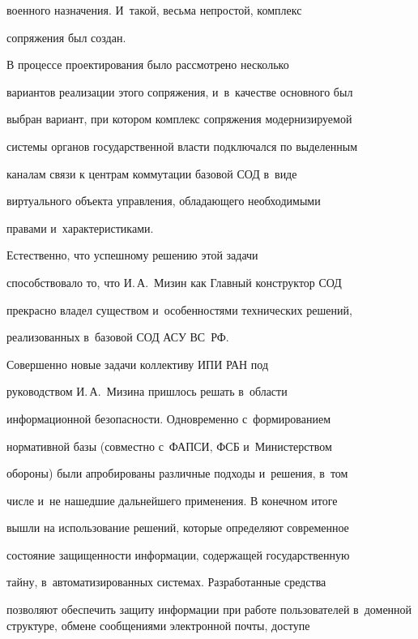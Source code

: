 военного назначения. И~такой, весьма непростой, комплекс


сопряжения был создан.





     В процессе проектирования было рассмотрено несколько


вариантов реализации этого сопряжения, и~в~качестве основного был


выбран вариант, при котором комплекс сопряжения модернизируемой


системы органов государственной власти подключался по выделенным


каналам связи к центрам коммутации базовой СОД в~виде


виртуального объекта управления, обладающего необходимыми


правами и~характеристиками.





     Естественно, что успешному решению этой задачи


способствовало то, что И.\,А.~Мизин как Главный конструктор СОД


прекрасно владел существом и~особенностями технических решений,


реализованных в~базовой СОД АСУ ВС~РФ.


{





}





     Совершенно новые задачи коллективу ИПИ РАН под


руководством И.\,А.~Мизина пришлось решать в~области


информационной безопасности. Одновременно с~формированием


нормативной базы (совместно с~ФАПСИ, ФСБ и~Министерством


обороны) были апробированы различные подходы и~решения, в~том


числе и~не нашедшие дальнейшего применения. В конечном итоге


вышли на использование решений, которые определяют современное


состояние защищенности информации, содержащей государственную


тайну, в~автоматизированных системах. Разработанные средства


позволяют обеспечить защиту информации при работе пользователей в~доменной структуре, обмене сообщениями электронной почты, доступе


